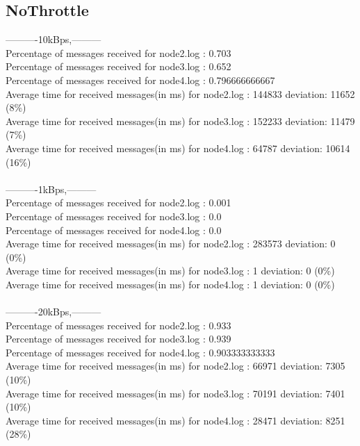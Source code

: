     \subsection{NoThrottle}\label{RawResults:NoThrottle}
        ----------10kBps,---------\\
        Percentage of messages received for node2.log : 0.703\\
        Percentage of messages received for node3.log : 0.652\\
        Percentage of messages received for node4.log : 0.796666666667\\
        Average time for received messages(in ms) for  node2.log : 144833 	deviation: 11652 (8\%)\\
        Average time for received messages(in ms) for  node3.log : 152233 	deviation: 11479 (7\%)\\
        Average time for received messages(in ms) for  node4.log : 64787 	deviation: 10614 (16\%)\\\\
        ----------1kBps,---------\\
        Percentage of messages received for node2.log : 0.001\\
        Percentage of messages received for node3.log : 0.0\\
        Percentage of messages received for node4.log : 0.0\\
        Average time for received messages(in ms) for  node2.log : 283573 	deviation: 0 (0\%)\\
        Average time for received messages(in ms) for  node3.log : 1 	deviation: 0 (0\%)\\
        Average time for received messages(in ms) for  node4.log : 1 	deviation: 0 (0\%)\\\\
        ----------20kBps,---------\\
        Percentage of messages received for node2.log : 0.933\\
        Percentage of messages received for node3.log : 0.939\\
        Percentage of messages received for node4.log : 0.903333333333\\
        Average time for received messages(in ms) for  node2.log : 66971 	deviation: 7305 (10\%)\\
        Average time for received messages(in ms) for  node3.log : 70191 	deviation: 7401 (10\%)\\
        Average time for received messages(in ms) for  node4.log : 28471 	deviation: 8251 (28\%)\\\\
